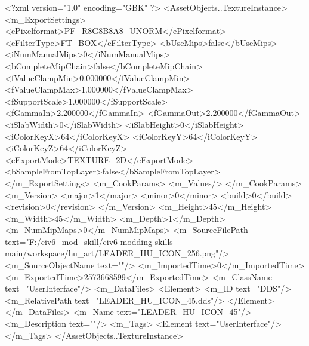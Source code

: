 <?xml version="1.0" encoding="GBK" ?>
<AssetObjects..TextureInstance>
	<m_ExportSettings>
		<ePixelformat>PF_R8G8B8A8_UNORM</ePixelformat>
		<eFilterType>FT_BOX</eFilterType>
		<bUseMips>false</bUseMips>
		<iNumManualMips>0</iNumManualMips>
		<bCompleteMipChain>false</bCompleteMipChain>
		<fValueClampMin>0.000000</fValueClampMin>
		<fValueClampMax>1.000000</fValueClampMax>
		<fSupportScale>1.000000</fSupportScale>
		<fGammaIn>2.200000</fGammaIn>
		<fGammaOut>2.200000</fGammaOut>
		<iSlabWidth>0</iSlabWidth>
		<iSlabHeight>0</iSlabHeight>
		<iColorKeyX>64</iColorKeyX>
		<iColorKeyY>64</iColorKeyY>
		<iColorKeyZ>64</iColorKeyZ>
		<eExportMode>TEXTURE_2D</eExportMode>
		<bSampleFromTopLayer>false</bSampleFromTopLayer>
	</m_ExportSettings>
	<m_CookParams>
		<m_Values/>
	</m_CookParams>
	<m_Version>
		<major>1</major>
		<minor>0</minor>
		<build>0</build>
		<revision>0</revision>
	</m_Version>
	<m_Height>45</m_Height>
	<m_Width>45</m_Width>
	<m_Depth>1</m_Depth>
	<m_NumMipMaps>0</m_NumMipMaps>
	<m_SourceFilePath text="F:/civ6_mod_skill/civ6-modding-skills-main/workspace/hu_art/LEADER_HU_ICON_256.png"/>
	<m_SourceObjectName text=""/>
	<m_ImportedTime>0</m_ImportedTime>
	<m_ExportedTime>2573668599</m_ExportedTime>
	<m_ClassName text="UserInterface"/>
	<m_DataFiles>
		<Element>
			<m_ID text="DDS"/>
			<m_RelativePath text="LEADER_HU_ICON_45.dds"/>
		</Element>
	</m_DataFiles>
	<m_Name text="LEADER_HU_ICON_45"/>
	<m_Description text=""/>
	<m_Tags>
		<Element text="UserInterface"/>
	</m_Tags>
</AssetObjects..TextureInstance>

